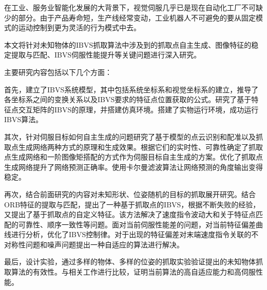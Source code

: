 \begin{cabstract}
在工业、服务业智能化发展的大背景下，视觉伺服几乎已是现在自动化工厂不可缺少的部分。由于产品寿命短，生产线经常变动，工业机器人不可避免的要从固定模式的运动控制到更为灵活的行为模式中去。


本文将针对未知物体的IBVS抓取算法中涉及到的抓取点自主生成、图像特征的稳定提取与匹配、IBVS伺服性能提升等关键问题进行深入研究。


主要研究内容包括以下几个方面：


首先，建立了IBVS系统模型，其中包括系统坐标系和视觉坐标系的建立，推导了各坐标系之间的变换关系以及IBVS要求的特征点位置获取的公式。研究了基于特征点交互矩阵的IBVS的原理，并搭建仿真环境。搭建了实物运行环境，成功运行IBVS算法。


其次，针对伺服目标如何自主生成的问题研究了基于模型的点云识别和配准以及抓取点生成网络两种方式的原理和生成效果。根据它们的实时性、可靠性确定了抓取点生成网络和一阶图像矩搭配的方式作为伺服目标自主生成的方案。优化了抓取点生成网络提升了网络预测正确率。使用卡尔曼滤波算法让网络预测的角度输出变得稳定。


再次，结合前面研究的内容对未知形状、位姿随机的目标的抓取展开研究。结合ORB特征的提取与匹配，提出了一种基于抓取点的IBVS，根据不断失败的经验，又提出了基于抓取点的自定义特征。该方法解决了速度指令波动大和关于特征点匹配的可靠性、顺序一致性等问题。面对当前伺服性能差的问题，对当前特征偏差曲线进行分析，优化了IBVS控制律。对于出现的特征偏差对末端速度指令关联的不对称性问题和噪声问题提出一种自适应的算法进行解决。


最后，设计实验，通过多样的物体、多样的位姿的抓取实验验证提出的未知物体抓取算法的有效性。与相关工作进行比较，证明当前算法的高自适应能力和高伺服性能。


\end{cabstract}

